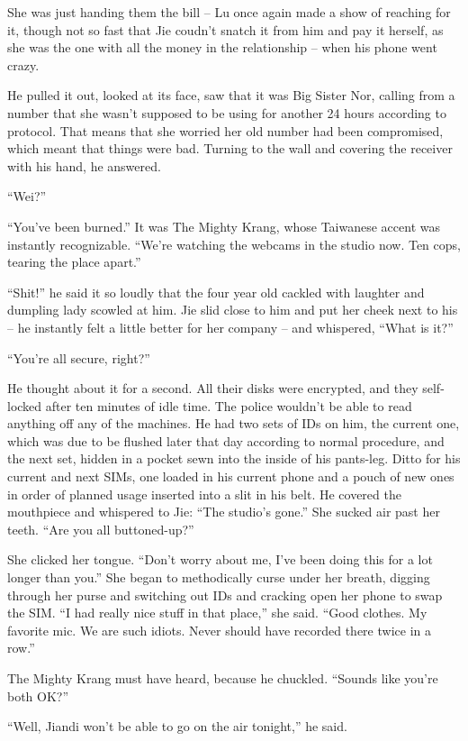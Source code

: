 She was just handing them the bill -- Lu once again made a show of
reaching for it, though not so fast that Jie coudn't snatch it from
him and pay it herself, as she was the one with all the money in
the relationship -- when his phone went crazy.

He pulled it out, looked at its face, saw that it was Big Sister
Nor, calling from a number that she wasn't supposed to be using for
another 24 hours according to protocol. That means that she worried
her old number had been compromised, which meant that things were
bad. Turning to the wall and covering the receiver with his hand,
he answered.

``Wei?''

``You've been burned.'' It was The Mighty Krang, whose Taiwanese
accent was instantly recognizable. ``We're watching the webcams in
the studio now. Ten cops, tearing the place apart.''

``Shit!'' he said it so loudly that the four year old cackled with
laughter and dumpling lady scowled at him. Jie slid close to him
and put her cheek next to his -- he instantly felt a little better
for her company -- and whispered, ``What is it?''

``You're all secure, right?''

He thought about it for a second. All their disks were encrypted,
and they self-locked after ten minutes of idle time. The police
wouldn't be able to read anything off any of the machines. He had
two sets of IDs on him, the current one, which was due to be
flushed later that day according to normal procedure, and the next
set, hidden in a pocket sewn into the inside of his pants-leg.
Ditto for his current and next SIMs, one loaded in his current
phone and a pouch of new ones in order of planned usage inserted
into a slit in his belt. He covered the mouthpiece and whispered to
Jie: ``The studio's gone.'' She sucked air past her teeth. ``Are you
all buttoned-up?''

She clicked her tongue. ``Don't worry about me, I've been doing this
for a lot longer than you.'' She began to methodically curse under
her breath, digging through her purse and switching out IDs and
cracking open her phone to swap the SIM. ``I had really nice stuff
in that place,'' she said. ``Good clothes. My favorite mic. We are
such idiots. Never should have recorded there twice in a row.''

The Mighty Krang must have heard, because he chuckled. ``Sounds like
you're both OK?''

``Well, Jiandi won't be able to go on the air tonight,'' he said.

